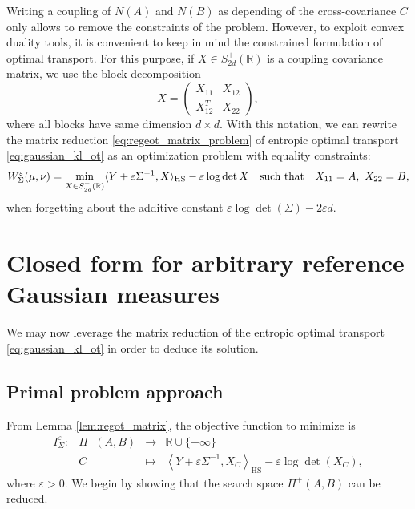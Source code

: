\documentclass[]{article}
\DeclareMathOperator{\HS}{HS}
\numberwithin{equation}{section}
\theoremstyle{plain}
\begin{document}
Writing a coupling of $N(A)$ and $N(B)$ as depending of the cross-covariance $C$ only allows to remove the constraints of the problem. However, to exploit convex duality tools, it is convenient to keep in mind the constrained formulation of optimal transport. For this purpose, if $X \in S_{2d}^{+}(\mathbb{R})$ is a coupling covariance matrix, we use the block decomposition 
	\begin{equation*}
		X = \begin{pmatrix}
			X_{11} & X_{12} \\
			X_{12}^T & X_{22}
 		\end{pmatrix},
	\end{equation*}
	where all blocks have same dimension $d\times d$. With this notation, we can rewrite the matrix reduction \eqref{eq:regeot_matrix_problem} of entropic optimal transport \eqref{eq:gaussian_kl_ot} as an optimization problem with equality constraints:
	\begin{equation}\label{eq:block_constrained_primal}
		W_{\Sigma}^{\varepsilon}(\mu, \nu) = \min_{X \in S_{2d}^+(\mathbb{R})}\langle Y + \varepsilon \Sigma^{-1}, X \rangle_{\rm HS} -  \varepsilon \log \det X \quad \text{such that} \quad X_{11} = A,~ X_{22} = B, 
	\end{equation}
when forgetting about the additive constant $\varepsilon\log \det(\Sigma) -2\varepsilon d$.


\section{Closed form for arbitrary reference Gaussian measures}\label{sec:closed_form}
We may now leverage the matrix reduction of the entropic optimal transport \eqref{eq:gaussian_kl_ot} in order to deduce its solution.

\subsection{Primal problem approach}

From Lemma \ref{lem:regot_matrix}, the objective function to minimize is 
\begin{equation}\label{eq:objective_regularized_gauss}
    \begin{array}{cccc}
        I_\Sigma^\varepsilon :& \Pi^{+}(A,B) & \rightarrow & \mathbb{R} \cup \{+ \infty\} \\
         & C & \mapsto & \left\langle Y + \varepsilon \Sigma^{-1}, X_C
         \right\rangle_{\HS} - \varepsilon \log \det (X_C),
    \end{array}
\end{equation}
where $\varepsilon>0$. We begin by showing that the search space $\Pi^+(A,B)$ can be reduced.
\end{document}
